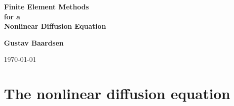 \documentclass[twoside]{article}
\begin{document}






\begin{center}
{\LARGE\bf Finite Element Methods \\ [0.1mm] for a \\ [1.5mm] Nonlinear Diffusion Equation}
\end{center}





\begin{center}
{\bf Gustav Baardsen} \\ [0mm]
\end{center}






\begin{center}
\today
\end{center}

\vspace{1cm}



\begin{abstract}
A standard finite element method is formulated for a general 
nonlinear diffusion equation. The equation is discretized in 
time using the Backward Euler method, and the nonlinear 
algebraic equations are solved with a Picard iteration 
scheme applied at the partial differential equation 
(PDE) level. The formulated numerical scheme is implemented 
using the FEniCS software package. Finally, explicit 
expressions needed for Newton's method are derived. 

\end{abstract}

\tableofcontents




\newpage

\section{The nonlinear diffusion equation}
\label{pde}
\end{document}

